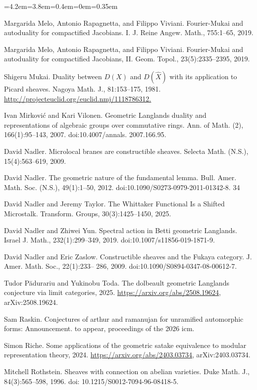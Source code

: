 \begin{list}{}{\leftmargin=4.2em=3.8em=0.4em\itemindent=0em\parsep=0.35em}
\item[{MRV19a}] Margarida Melo, Antonio Rapagnetta, and Filippo Viviani. Fourier-Mukai and autoduality for compactified Jacobians. I. J. Reine Angew. Math., 755:1–65, 2019.
\item[{MRV19b}] Margarida Melo, Antonio Rapagnetta, and Filippo Viviani. Fourier-Mukai and autoduality for compactified Jacobians, II. Geom. Topol., 23(5):2335–2395, 2019.
\item[{Muk81}] Shigeru Mukai. Duality between $D(X)$ and $D(\hat{X})$ with its application to Picard sheaves. Nagoya Math. J., 81:153–175, 1981. \url{http://projecteuclid.org/euclid.nmj/1118786312.}
\item[{MV07}] Ivan Mirković and Kari Vilonen. Geometric Langlands duality and representations of algebraic groups over commutative rings. Ann. of Math. (2), 166(1):95–143, 2007. doi:10.4007/annals. 2007.166.95.
\item[{Nad09}] David Nadler. Microlocal branes are constructible sheaves. Selecta Math. (N.S.), 15(4):563–619, 2009.
\item[{Nad12}] David Nadler. The geometric nature of the fundamental lemma. Bull. Amer. Math. Soc. (N.S.), 49(1):1–50, 2012. doi:10.1090/S0273-0979-2011-01342-8. 34
\item[{NT25}] David Nadler and Jeremy Taylor. The Whittaker Functional Is a Shifted Microstalk. Transform. Groups, 30(3):1425–1450, 2025.
\item[{NY19}] David Nadler and Zhiwei Yun. Spectral action in Betti geometric Langlands. Israel J. Math., 232(1):299–349, 2019. doi:10.1007/s11856-019-1871-9.
\item[{NZ09}] David Nadler and Eric Zaslow. Constructible sheaves and the Fukaya category. J. Amer. Math. Soc., 22(1):233– 286, 2009. doi:10.1090/S0894-0347-08-00612-7.
\item[{PT25}] Tudor Pădurariu and Yukinobu Toda. The dolbeault geometric Langlands conjecture via limit categories, 2025. \url{https://arxiv.org/abs/2508.19624}, arXiv:2508.19624.
\item[{Ras}] Sam Raskin. Conjectures of arthur and ramanujan for unramified automorphic forms: Announcement. to appear, proceedings of the 2026 icm.
\item[{Ric24}] Simon Riche. Some applications of the geometric satake equivalence to modular representation theory, 2024. \url{https://arxiv.org/abs/2403.03734}, arXiv:2403.03734.
\item[{Rot96}] Mitchell Rothstein. Sheaves with connection on abelian varieties. Duke Math. J., 84(3):565–598, 1996. doi: 10.1215/S0012-7094-96-08418-5.

\end{list}
